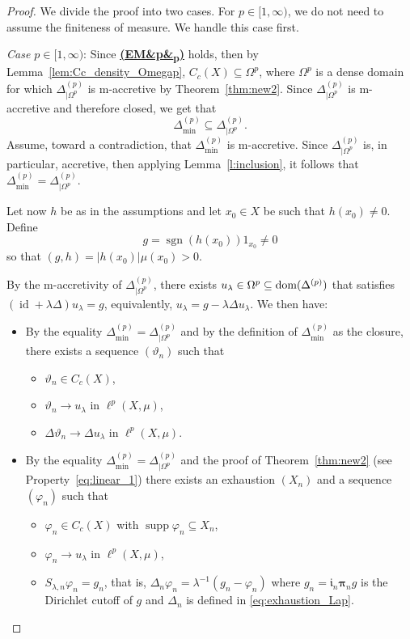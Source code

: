 \documentclass[letterpaper]{article}
\theoremstyle{definition}
\theoremstyle{named}
\numberwithin{equation}{section}
\newcommand{\EM}[1][]{\hyperlink{ass:EM}{\textup{\textbf{(EM\ifx&#1&\else\textsubscript{#1}\fi)}}}}
\newcommand{\lm}{\lambda}
\newcommand{\sgn}{\operatorname{sgn}}
\newcommand{\dom}{\textnormal{dom}} %
\newcommand{\id}{\operatorname{id}}
\newcommand{\deltam}{\Delta_{\min}}
\begin{document}
\begin{proof}
We divide the proof into two cases. For $p \in [1,\infty)$, we do not need
to assume the finiteness of measure. We handle this case first.

\noindent
\textit{Case $p \in [1,\infty)$}: Since \EM[p] holds, then 
by Lemma~\ref{lem:Cc_density_Omegap}, $C_c(X) \subseteq \Omega^p$, where $\Omega^p$ is 
a dense domain for which $\Delta^{(p)}_{|\Omega^p}$ is m-accretive by Theorem~\ref{thm:new2}.  
Since  $\Delta^{(p)}_{|\Omega^p}$ is m-accretive and therefore closed, we get that
\begin{equation*}
\deltam^{(p)} \subseteq \Delta^{(p)}_{|\Omega^p}.
\end{equation*}
Assume, toward a contradiction, that $\deltam^{(p)}$ is m-accretive. 
Since $\Delta^{(p)}_{|\Omega^p}$ is, in particular, accretive, then applying Lemma~\ref{l:inclusion}, 
it follows that $\deltam^{(p)} = \Delta^{(p)}_{|\Omega^p}$. 

Let now $h$ be as in the assumptions and let $x_0 \in X$ be such that $h(x_0) \neq 0$. Define 
$$g = \sgn(h(x_0))1_{x_0} \neq 0 $$
    so that $(g,h) = |h(x_0)|\mu(x_0) > 0$.

By the m-accretivity of $\Delta^{(p)}_{|\Omega^p}$, 
there exists $u_\lm \in \Omega^p \subseteq \dom(\Delta^{(p)})$ 
that satisfies $(\id + \lm \Delta )u_\lm =g$, equivalently, $u_\lm = g - \lm \Delta u_\lm$. We then have:

\begin{itemize}
    \item[(i)] By the equality  $\deltam^{(p)} = \Delta^{(p)}_{|\Omega^p}$ and by the definition 
    of $\deltam^{(p)}$ as the closure, there exists a sequence $(\vartheta_n)$  such that
    \begin{itemize}
       \item[(i.a)] $\vartheta_n \in C_c(X)$,
        \item[(i.b)] $\vartheta_n \to u_\lm$ in $\ell^p(X,\mu)$,
        \item[(i.c)] $\Delta\vartheta_n \to \Delta u_\lm$ in $\ell^p(X,\mu)$.
    \end{itemize}

    \item[(ii)] By the equality $\deltam^{(p)} = \Delta^{(p)}_{|\Omega^p}$ and 
    the proof of Theorem~\ref{thm:new2} (see Property~\eqref{eq:linear_1}) 
    there exists an exhaustion $(X_n)$ and a sequence $(\varphi_n)$  such that
    \begin{itemize}
       \item[(ii.a)] $\varphi_n \in C_c(X)$ with $\operatorname{supp}\varphi_n \subseteq X_n$,
        \item[(ii.b)] $\varphi_n \to u_\lm$ in $\ell^p(X,\mu)$,
        \item[(ii.c)] $S_{\lm,n}\varphi_n = g_n$, that is, $\Delta_n\varphi_n = \lm^{-1}(g_n - \varphi_n)$ where $g_n = \boldsymbol{\mathfrak{i}}_n\boldsymbol{\pi}_ng$ is the Dirichlet cutoff of $g$
        and $\Delta_n$ is defined in \eqref{eq:exhaustion_Lap}. 
    \end{itemize}
\end{itemize}


\end{proof}
\end{document}
